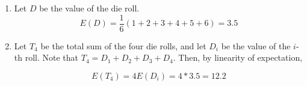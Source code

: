 \begin{enumerate}[label=(\alph*)]
\item Let $D$ be the value of the die roll.
$$E(D) = \frac{1}{6}(1 + 2 + 3 + 4 + 5 + 6) = 3.5$$

\item Let $T_{4}$ be the total sum of the four die rolls, and let $D_{i}$ be
the value of the $i$-th roll. Note that $T_{4} = D_
{1} + D_{2} + D_{3} + D_{4}$. Then, by linearity of expectation,

$$E(T_{4}) = 4E(D_{i}) = 4*3.5 = 12.2$$
\end{enumerate}